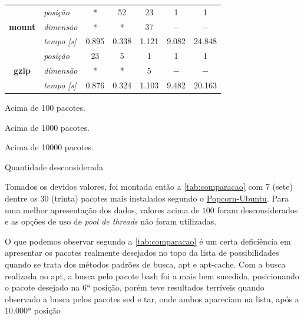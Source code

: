 \begin{table}[htbp]
{\begin{tabular}[c]{clccccc}
\multicolumn{ 1}{c}{} & \textit{posição} & * & 52 & 23 & 1 & 1 \\ 
\multicolumn{ 1}{c}{\textbf{mount}} & \textit{dimensão} & * & * & 37 & $-$ & $-$ \\ 
\multicolumn{ 1}{c}{} & \textit{tempo [s]} & 0.895 & 0.338 & 1.121 & 9.082 & 24.848 \\ \hline
\multicolumn{ 1}{c}{} & \textit{posição} & 23 & 5 & 1 & 1 & 1 \\ 
\multicolumn{ 1}{c}{\textbf{gzip}} & \textit{dimensão} & * & * & 5 & $-$ & $-$ \\ 
\multicolumn{ 1}{c}{} & \textit{tempo [s]} & 0.876 & 0.324 & 1.103 & 9.482 & 20.163 \\ \bottomrule
\end{tabular}
}

\label{tab:comparacao}
\begin{description}
	\tiny
	\item [*] Acima de 100 pacotes.
	\item [**] Acima de 1000 pacotes.
	\item [***] Acima de 10000 pacotes.
	\item [$-$] Quantidade desconsiderada
\end{description}

\end{table}


Tomados os devidos valores, foi montada então a \autoref{tab:comparacao} com 7 (sete) dentre os 30 (trinta) pacotes mais instalados segundo o \href{http://popcon.ubuntu.com/}{Popcorn-Ubuntu}. Para uma melhor apresentação dos dados, valores acima de $100$ foram desconsiderados e as opções de uso de \textit{pool de threads} não foram utilizadas.

O que  podemos observar  segundo a \autoref{tab:comparacao} é um certa deficiência em apresentar os pacotes realmente desejados no topo da lista de possibilidades quando se trata dos métodos padrões de busca, {\code apt} e {\code apt-cache}. Com a busca realizada no {\code apt}, a busca pelo pacote {\code bash} foi a mais bem sucedida, posicionando o pacote desejado na $6ª$ posição, porém teve resultados terríveis quando observado a busca pelos pacotes {\code sed} e {\code tar}, onde ambos apareciam na lista, após a $10.000ª$ posição


